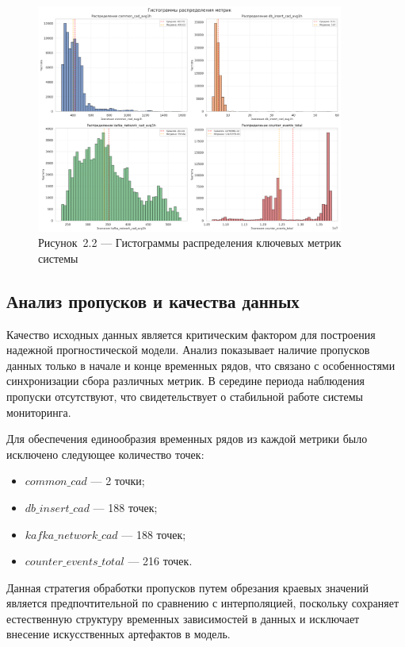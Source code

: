 \begin{figure}[H]
	\centering
	\includegraphics[width=0.9\textwidth]{figures/chapter2/metrics_distribution.png}
	\caption*{Рисунок~2.2 --- Гистограммы распределения ключевых метрик системы}
	\label{fig:metrics_distribution}
\end{figure}

\subsection{Анализ пропусков и качества данных}

\hspace*{1.25cm}Качество исходных данных является критическим фактором для построения надежной прогностической модели. Анализ показывает наличие пропусков данных только в начале и конце временных рядов, что связано с особенностями синхронизации сбора различных метрик. В середине периода наблюдения пропуски отсутствуют, что свидетельствует о стабильной работе системы мониторинга.

\hspace*{1.25cm}Для обеспечения единообразия временных рядов из каждой метрики было исключено следующее количество точек:

\begin{itemize}
	\item $common\_cad$ --- 2 точки;
	\item $db\_insert\_cad$ --- 188 точек;
	\item $kafka\_network\_cad$ --- 188 точек;
	\item $counter\_events\_total$ --- 216 точек.
\end{itemize}

\hspace*{1.25cm}Данная стратегия обработки пропусков путем обрезания краевых значений является предпочтительной по сравнению с интерполяцией, поскольку сохраняет естественную структуру временных зависимостей в данных и исключает внесение искусственных артефактов в модель.

